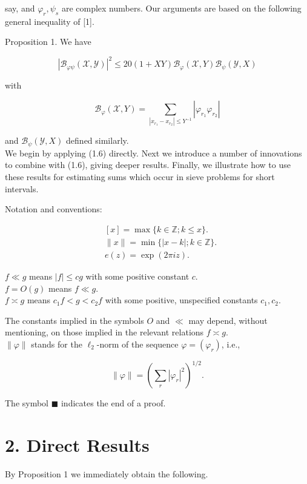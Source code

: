 \documentclass[10pt]{article}
\begin{document}
say, and $\varphi_{r}, \psi_{s}$ are complex numbers. Our arguments are based on the following general inequality of [1].

Proposition 1. We have


\begin{equation*}
\left|\mathscr{B}_{\varphi \psi}(\mathscr{X}, \mathscr{Y})\right|^{2} \leqslant 20(1+X Y) \mathscr{B}_{\varphi}(\mathscr{X}, Y) \mathscr{B}_{\psi}(\mathscr{Y}, X) \tag{1.6}
\end{equation*}


with

$$
\mathscr{B}_{\varphi}(\mathscr{X}, Y)=\sum_{\left|x_{r_{1}}-x_{r_{2}}\right| \leqslant Y^{-1}}\left|\varphi_{r_{1}} \varphi_{r_{2}}\right|
$$

and $\mathscr{B}_{\psi}(\mathscr{Y}, X)$ defined similarly.\\
We begin by applying (1.6) directly. Next we introduce a number of innovations to combine with (1.6), giving deeper results. Finally, we illustrate how to use these results for estimating sums which occur in sieve problems for short intervals.

Notation and conventions:

$$
\begin{aligned}
& {[x]=\max \{k \in \mathbb{Z} ; k \leqslant x\} .} \\
& \|x\|=\min \{|x-k| ; k \in \mathbb{Z}\} . \\
& e(z)=\exp (2 \pi i z) .
\end{aligned}
$$

$f \ll g$ means $|f| \leqslant c g$ with some positive constant $c$.\\
$f=O(g)$ means $f \ll g$.\\
$f \asymp g$ means $c_{1} f<g<c_{2} f$ with some positive, unspecified constants $c_{1}, c_{2}$.

The constants implied in the symbols $O$ and $\ll$ may depend, without mentioning, on those implied in the relevant relations $f \asymp g$.\\
$\|\varphi\|$ stands for the $\ell_{2}$-norm of the sequence $\varphi=\left(\varphi_{r}\right)$, i.e.,

$$
\|\varphi\|=\left(\sum_{r}\left|\varphi_{r}\right|^{2}\right)^{1 / 2} .
$$

The symbol $\blacksquare$ indicates the end of a proof.

\section*{2. Direct Results}
By Proposition 1 we immediately obtain the following.
\end{document}
